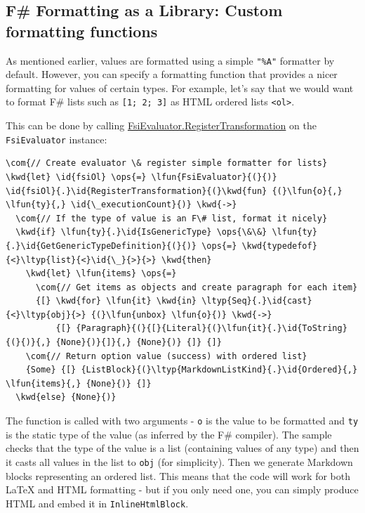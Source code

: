\documentclass{article}
\newcommand{\id}[1]{\textcolor{black}{#1}}
\newcommand{\com}[1]{\textcolor{officegreen}{#1}}
\newcommand{\kwd}[1]{\textcolor{navy}{#1}}
\newcommand{\ops}[1]{\textcolor{purple}{#1}}
\begin{document}
\subsection*{F\# Formatting as a Library: Custom formatting functions}



As mentioned earlier, values are formatted using a simple \texttt{"\%A"} formatter by default.
However, you can specify a formatting function that provides a nicer formatting for values
of certain types. For example, let's say that we would want to format F\# lists such as
\texttt{[1; 2; 3]} as HTML ordered lists \texttt{<ol>}.


This can be done by calling \href{https://fsprojects.github.io/FSharp.Formatting/reference/fsharp-formatting-literate-evaluation-fsievaluator.html}{FsiEvaluator.RegisterTransformation} on the \texttt{FsiEvaluator} instance:
\begin{Verbatim}[commandchars=\\\{\}]
\com{// Create evaluator \& register simple formatter for lists}
\kwd{let} \id{fsiOl} \ops{=} \lfun{FsiEvaluator}{(}{)}
\id{fsiOl}{.}\id{RegisterTransformation}{(}\kwd{fun} {(}\lfun{o}{,} \lfun{ty}{,} \id{\_executionCount}{)} \kwd{->}
  \com{// If the type of value is an F\# list, format it nicely}
  \kwd{if} \lfun{ty}{.}\id{IsGenericType} \ops{\&\&} \lfun{ty}{.}\id{GetGenericTypeDefinition}{(}{)} \ops{=} \kwd{typedefof}{<}\ltyp{list}{<}\id{\_}{>}{>} \kwd{then}
    \kwd{let} \lfun{items} \ops{=}
      \com{// Get items as objects and create paragraph for each item}
      {[} \kwd{for} \lfun{it} \kwd{in} \ltyp{Seq}{.}\id{cast}{<}\ltyp{obj}{>} {(}\lfun{unbox} \lfun{o}{)} \kwd{->}
          {[} {Paragraph}{(}{[}{Literal}{(}\lfun{it}{.}\id{ToString}{(}{)}{,} {None}{)}{]}{,} {None}{)} {]} {]}
    \com{// Return option value (success) with ordered list}
    {Some} {[} {ListBlock}{(}\ltyp{MarkdownListKind}{.}\id{Ordered}{,} \lfun{items}{,} {None}{)} {]}
  \kwd{else} {None}{)}
\end{Verbatim}



The function is called with two arguments - \texttt{o} is the value to be formatted and \texttt{ty}
is the static type of the value (as inferred by the F\# compiler). The sample checks
that the type of the value is a list (containing values of any type) and then it
casts all values in the list to \texttt{obj} (for simplicity). Then we generate Markdown
blocks representing an ordered list. This means that the code will work for both
LaTeX and HTML formatting - but if you only need one, you can simply produce HTML and
embed it in \texttt{InlineHtmlBlock}.
\end{document}

